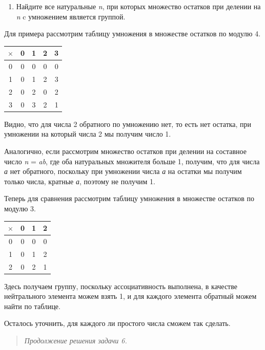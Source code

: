 \documentclass[12pt]{article}
\begin{document}
\begin{enumerate}
    \def\labelenumi{\arabic{enumi}.}
    \item
          Найдите все натуральные \emph{n}, при которых множество остатков при
          делении на \emph{n} c умножением является группой.
\end{enumerate}

Для примера рассмотрим таблицу умножения в множестве остатков по модулю
4.

\begin{tabular}{|c|c|c|c|c|}
    \hline
    $\times$ & 0 & 1 & 2 & 3 \\
    \hline
    0        & 0 & 0 & 0 & 0 \\
    \hline
    1        & 0 & 1 & 2 & 3 \\
    \hline
    2        & 0 & 2 & 0 & 2 \\
    \hline
    3        & 0 & 3 & 2 & 1 \\
    \hline
\end{tabular}

Видно, что для числа 2 обратного по умножению нет, то есть нет остатка,
при умножении на который числа 2 мы получим число 1.

Аналогично, если рассмотрим множество остатков при делении на составное
число \emph{n} = \emph{ab}, где оба натуральных множителя больше 1,
получим, что для числа \emph{а} нет обратного, поскольку при умножении
числа \emph{а} на остатки мы получим только числа, кратные \emph{а},
поэтому не получим 1.

Теперь для сравнения рассмотрим таблицу умножения в множестве остатков
по модулю 3.

\begin{tabular}{|c|c|c|c|}
    \hline
    $\times$ & 0 & 1 & 2 \\
    \hline
    0        & 0 & 0 & 0 \\
    \hline
    1        & 0 & 1 & 2 \\
    \hline
    2        & 0 & 2 & 1 \\
    \hline
\end{tabular}

Здесь получаем группу, поскольку ассоциативность выполнена, в качестве
нейтрального элемента можем взять 1, и для каждого элемента обратный
можем найти по таблице.

Осталось уточнить, для каждого ли простого числа сможем так сделать.

\begin{quote}
    \emph{Продолжение решения задачи 6.}
\end{quote}
\end{document}
